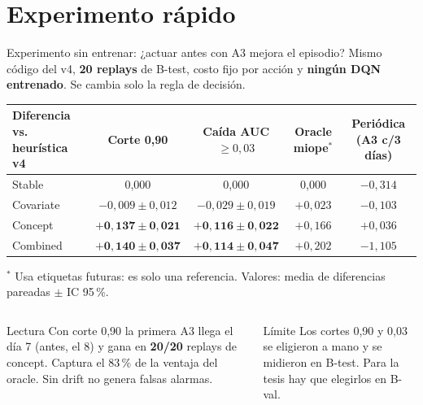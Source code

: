 \documentclass[aspectratio=169,10pt,xcolor=table]{beamer}
\begin{document}
\section{Experimento rápido}
\begin{frame}{Experimento sin entrenar: ¿actuar antes con A3 mejora el episodio?}
\small
Mismo código del v4, \textbf{20 replays} de B-test, costo fijo por acción y
\textbf{ningún DQN entrenado}. Se cambia solo la regla de decisión.
\vspace{0.4em}

\centering
\footnotesize
\begin{tabular}{@{}lcccc@{}}
\toprule
Diferencia vs. heurística v4 & Corte 0,90 & Caída AUC $\geq 0{,}03$ & Oracle miope$^{*}$ & Periódica (A3 c/3 días) \\
\midrule
Stable    & 0,000 & 0,000 & 0,000 & $-0{,}314$ \\
Covariate & $-0{,}009 \pm 0{,}012$ & $-0{,}029 \pm 0{,}019$ & $+0{,}023$ & $-0{,}103$ \\
\rowcolor{DARLgold!20}
Concept   & $\mathbf{+0{,}137 \pm 0{,}021}$ & $\mathbf{+0{,}116 \pm 0{,}022}$ & $+0{,}166$ & $+0{,}036$ \\
\rowcolor{DARLgold!20}
Combined  & $\mathbf{+0{,}140 \pm 0{,}037}$ & $\mathbf{+0{,}114 \pm 0{,}047}$ & $+0{,}202$ & $-1{,}105$ \\
\bottomrule
\end{tabular}

\vspace{0.2em}
\raggedright
\scriptsize $^{*}$ Usa etiquetas futuras: es solo una referencia. Valores: media de diferencias pareadas $\pm$ IC 95\,\%.
\normalsize
\vspace{0.6em}
\begin{columns}[T]
\begin{block}{Lectura}
Con corte 0,90 la primera A3 llega el día 7 (antes, el 8) y gana en
\textbf{20/20} replays de concept. Captura el 83\,\% de la ventaja del oracle.
Sin drift no genera falsas alarmas.
\end{block}
\begin{alertblock}{Límite}
Los cortes 0,90 y 0,03 se eligieron a mano y se midieron en B-test.
Para la tesis hay que elegirlos en B-val.
\end{alertblock}
\end{columns}
\end{frame}
\end{document}
